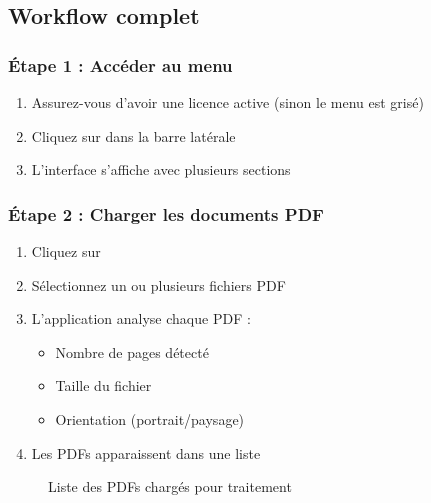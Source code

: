 
\subsection{Workflow complet}

\subsubsection{Étape 1 : Accéder au menu}

\begin{enumerate}[leftmargin=*]
    \item Assurez-vous d'avoir une licence active (sinon le menu est grisé)
    \item Cliquez sur  dans la barre latérale
    \item L'interface s'affiche avec plusieurs sections
\end{enumerate}

\subsubsection{Étape 2 : Charger les documents PDF}

\begin{enumerate}[leftmargin=*]
    \item Cliquez sur 
    \item Sélectionnez un ou plusieurs fichiers PDF
    \item L'application analyse chaque PDF :
    \begin{itemize}
        \item Nombre de pages détecté
        \item Taille du fichier
        \item Orientation (portrait/paysage)
    \end{itemize}
    \item Les PDFs apparaissent dans une liste
\end{enumerate}

\begin{figure}[h]
    \centering
    \caption{Liste des PDFs chargés pour traitement}
\end{figure}

